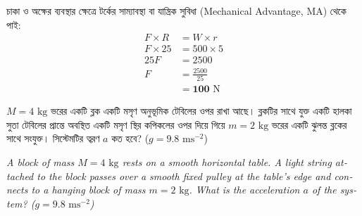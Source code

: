 \documentclass[12pt, a4paper]{article}
\begin{document}
\begin{tcolorbox}[solutionbox={সমাধান (Solution)}]
    \noindent
    চাকা ও অক্ষের ব্যবস্থার ক্ষেত্রে টর্কের সাম্যাবস্থা বা যান্ত্রিক সুবিধা (Mechanical Advantage, MA) থেকে পাই:
    \begin{align*}
        F \times R &= W \times r \\
        F \times 25 &= 500 \times 5 \\
        25 F &= 2500 \\
        F &= \frac{2500}{25} \\
        &= \mathbf{100}\text{ N}
    \end{align*}
\end{tcolorbox}
\begin{tcolorbox}[questionbox={প্রশ্ন (Question) 12}]
    \noindent
    $M = 4\text{ kg}$ ভরের একটি ব্লক একটি মসৃণ অনুভূমিক টেবিলের ওপর রাখা আছে। ব্লকটির সাথে যুক্ত একটি হালকা সুতা টেবিলের প্রান্তে অবস্থিত একটি মসৃণ স্থির কপিকলের ওপর দিয়ে গিয়ে $m = 2\text{ kg}$ ভরের একটি ঝুলন্ত ব্লকের সাথে সংযুক্ত। সিস্টেমটির ত্বরণ $a$ কত হবে? ($g = 9.8\text{ ms}^{-2}$)
    
    \vspace{0.8em}
    \begin{english}
    \noindent\textit{\color{darkgray}
    A block of mass $M = 4\text{ kg}$ rests on a smooth horizontal table. A light string attached to the block passes over a smooth fixed pulley at the table's edge and connects to a hanging block of mass $m = 2\text{ kg}$. What is the acceleration $a$ of the system? ($g = 9.8\text{ ms}^{-2}$)
    }
    \end{english}
\end{tcolorbox}
\end{document}

